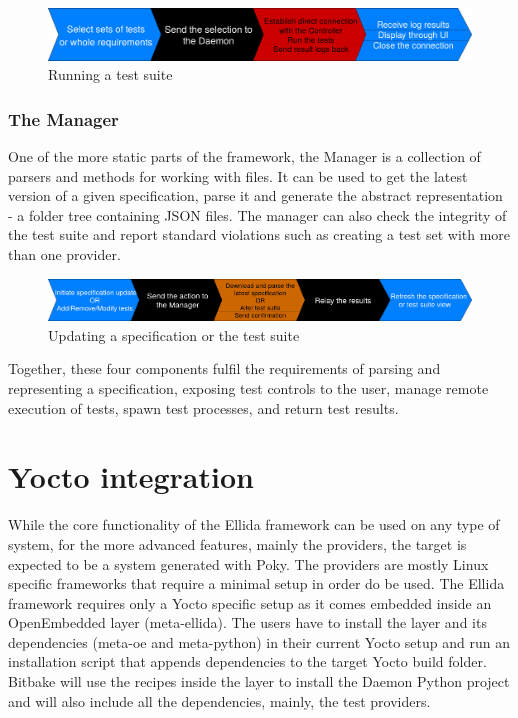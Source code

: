\begin{figure}[h!]
  \centering
	\includegraphics[width=\textwidth]{images/execution_flow2.png}
    \caption{Running a test suite}
\end{figure}

\subsubsection*{The Manager}
One of the more static parts of the framework, the Manager is a collection of parsers and methods for working with files. It can be used to get the latest version of a given specification, parse it and generate the abstract representation - a folder tree containing JSON files. The manager can also check the integrity of the test suite and report standard violations such as creating a test set with more than one provider.

\begin{figure}[h!]
  \centering
	\includegraphics[width=\textwidth]{images/execution_flow1.png}
    \caption{Updating a specification or the test suite}
\end{figure}

\vspace{7mm}

Together, these four components fulfil the requirements of parsing and representing a specification, exposing test controls to the user, manage remote execution of tests, spawn test processes, and return test results.

\section*{}

\section{Yocto integration}

While the core functionality of the Ellida framework can be used on any type of system, for the more advanced features, mainly the providers, the target is expected to be a system generated with Poky. The providers are mostly Linux specific frameworks that require a minimal setup in order do be used. The Ellida framework requires only a Yocto specific setup as it comes embedded inside an OpenEmbedded layer (meta-ellida). The users have to install the layer and its dependencies (meta-oe and meta-python) in their current Yocto setup and run an installation script that appends dependencies to the target Yocto build folder. Bitbake will use the recipes inside the layer to install the Daemon Python project and will also include all the dependencies, mainly, the test providers.

